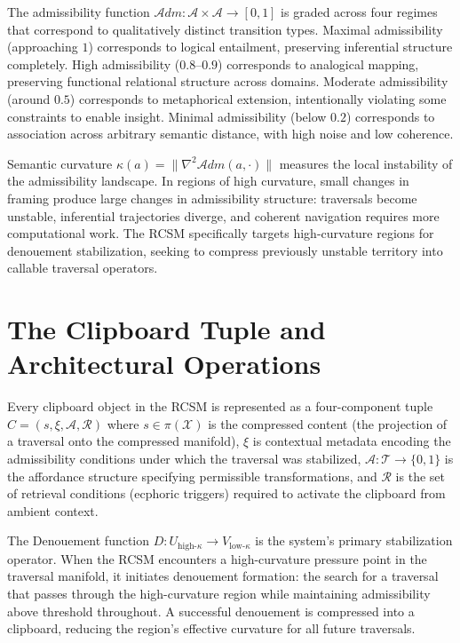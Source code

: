 \documentclass[12pt,oneside]{book}
\theoremstyle{plain}
\theoremstyle{definition}
\theoremstyle{plain}
\newcommand{\cA}{\mathcal{A}}
\newcommand{\cR}{\mathcal{R}}
\newcommand{\cT}{\mathcal{T}}
\newcommand{\cX}{\mathcal{X}}
\begin{document}
The admissibility function $\mathcal{A}dm : \cA \times \cA \to [0,1]$ is graded across four regimes that correspond to qualitatively distinct transition types. Maximal admissibility (approaching $1$) corresponds to logical entailment, preserving inferential structure completely. High admissibility ($0.8$--$0.9$) corresponds to analogical mapping, preserving functional relational structure across domains. Moderate admissibility (around $0.5$) corresponds to metaphorical extension, intentionally violating some constraints to enable insight. Minimal admissibility (below $0.2$) corresponds to association across arbitrary semantic distance, with high noise and low coherence.

Semantic curvature $\kappa(a) = \|\nabla^2 \mathcal{A}dm(a,\cdot)\|$ measures the local instability of the admissibility landscape. In regions of high curvature, small changes in framing produce large changes in admissibility structure: traversals become unstable, inferential trajectories diverge, and coherent navigation requires more computational work. The RCSM specifically targets high-curvature regions for denouement stabilization, seeking to compress previously unstable territory into callable traversal operators.

\section{The Clipboard Tuple and Architectural Operations}

Every clipboard object in the RCSM is represented as a four-component tuple $C = (s, \xi, \cA, \cR)$ where $s \in \pi(\cX)$ is the compressed content (the projection of a traversal onto the compressed manifold), $\xi$ is contextual metadata encoding the admissibility conditions under which the traversal was stabilized, $\cA : \cT \to \{0,1\}$ is the affordance structure specifying permissible transformations, and $\cR$ is the set of retrieval conditions (ecphoric triggers) required to activate the clipboard from ambient context.

The Denouement function $D : U_{\text{high-}\kappa} \to V_{\text{low-}\kappa}$ is the system's primary stabilization operator. When the RCSM encounters a high-curvature pressure point in the traversal manifold, it initiates denouement formation: the search for a traversal that passes through the high-curvature region while maintaining admissibility above threshold throughout. A successful denouement is compressed into a clipboard, reducing the region's effective curvature for all future traversals.
\end{document}
